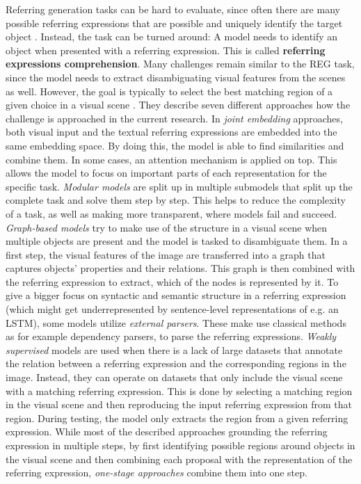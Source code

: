Referring generation tasks can be hard to evaluate, since often there are many possible referring expressions that are possible and uniquely identify the target object \citep{Mao2016}.
Instead, the task can be turned around: A model needs to identify an object when presented with a referring expression.
This is called \textbf{referring expressions comprehension}.
Many challenges remain similar to the REG task, since the model needs to extract disambiguating visual features from the scenes as well.
However, the goal is typically to select the best matching region of a given choice in a visual scene \citep{Qiao2020}.
They describe seven different approaches how the challenge is approached in the current research.
In \emph{joint embedding} approaches, both visual input and the textual referring expressions are embedded into the same embedding space.
By doing this, the model is able to find similarities and combine them.
In some cases, an attention mechanism is applied on top.
This allows the model to focus on important parts of each representation for the specific task.
\emph{Modular models} are split up in multiple submodels that split up the complete task and solve them step by step.
This helps to reduce the complexity of a task, as well as making more transparent, where models fail and succeed.
\emph{Graph-based models} try to make use of the structure in a visual scene when multiple objects are present and the model is tasked to disambiguate them.
In a first step, the visual features of the image are transferred into a graph that captures objects' properties and their relations.
This graph is then combined with the referring expression to extract, which of the nodes is represented by it.
To give a bigger focus on syntactic and semantic structure in a referring expression (which might get underrepresented by sentence-level representations of e.g. an LSTM), some models utilize \emph{external parsers}.
These make use classical methods as for example dependency parsers, to parse the referring expressions.
\emph{Weakly supervised} models are used when there is a lack of large datasets that annotate the relation between a referring expression and the corresponding regions in the image.
Instead, they can operate on datasets that only include the visual scene with a matching referring expression.
This is done by selecting a matching region in the visual scene and then reproducing the input referring expression from that region.
During testing, the model only extracts the region from a given referring expression.
While most of the described approaches grounding the referring expression in multiple steps, by first identifying possible regions around objects in the visual scene and then combining each proposal with the representation of the referring expression, \emph{one-stage approaches} combine them into one step.
